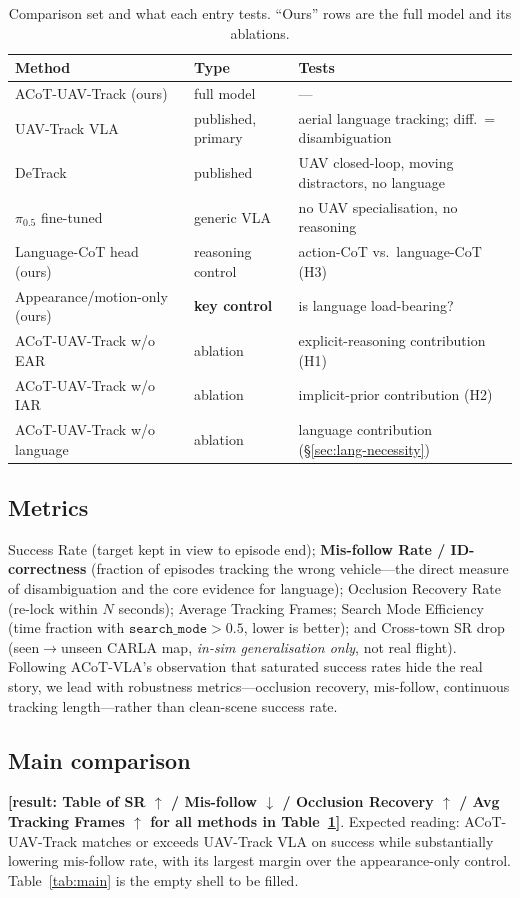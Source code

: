 \documentclass[11pt]{article}
\newcommand{\ph}[1]{{\color{red}\textbf{[#1]}}}
\newcommand{\sys}{ACoT-UAV-Track}
\newcommand{\ear}{EAR}
\newcommand{\iar}{IAR}
\begin{document}
\begin{table}[t]
\centering
\caption{Comparison set and what each entry tests. ``Ours'' rows are the
full model and its ablations.}
\label{tab:baselines}
\small
\begin{tabular}{@{}lll@{}}
\toprule
Method & Type & Tests \\
\midrule
\sys{} (ours) & full model & --- \\
UAV-Track VLA \citep{uavtrackvla} & published, primary & aerial language tracking; diff.\ = disambiguation \\
DeTrack \citep{detrack} & published & UAV closed-loop, moving distractors, no language \\
$\pi_{0.5}$ fine-tuned \citep{pizerohalf} & generic VLA & no UAV specialisation, no reasoning \\
Language-CoT head (ours) & reasoning control & action-CoT vs.\ language-CoT (H3) \\
Appearance/motion-only (ours) & \textbf{key control} & is language load-bearing? \\
\sys{} w/o \ear{} & ablation & explicit-reasoning contribution (H1) \\
\sys{} w/o \iar{} & ablation & implicit-prior contribution (H2) \\
\sys{} w/o language & ablation & language contribution (\S\ref{sec:lang-necessity}) \\
\bottomrule
\end{tabular}
\end{table}

\subsection{Metrics}
\label{sec:exp-metrics}
Success Rate (target kept in view to episode end); \textbf{Mis-follow Rate /
ID-correctness} (fraction of episodes tracking the wrong vehicle---the direct
measure of disambiguation and the core evidence for language); Occlusion
Recovery Rate (re-lock within $N$ seconds); Average Tracking Frames; Search
Mode Efficiency (time fraction with $\texttt{search\_mode}{>}0.5$, lower is
better); and Cross-town SR drop (seen$\to$unseen CARLA map, \emph{in-sim
generalisation only}, not real flight). Following ACoT-VLA's observation that
saturated success rates hide the real story, we lead with robustness
metrics---occlusion recovery, mis-follow, continuous tracking length---rather
than clean-scene success rate.

\subsection{Main comparison}
\label{sec:exp-main}
\ph{result: Table of SR $\uparrow$ / Mis-follow $\downarrow$ / Occlusion
Recovery $\uparrow$ / Avg Tracking Frames $\uparrow$ for all methods in
Table~\ref{tab:baselines}}. Expected reading:
\sys{} matches or exceeds UAV-Track VLA on success while substantially
lowering mis-follow rate, with its largest margin over the appearance-only
control. Table~\ref{tab:main} is the empty shell to be filled.
\end{document}
